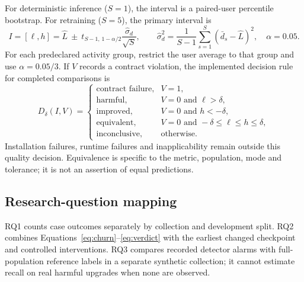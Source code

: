 For deterministic inference ($S=1$), the interval is a paired-user percentile
bootstrap. For retraining ($S=5$), the primary interval is
\begin{equation}
 I=[\ell,h]=\widehat L\ \pm\
 t_{S-1,\,1-\alpha/2}\frac{\widehat\sigma_d}{\sqrt S},\qquad
 \widehat\sigma_d^2=\frac{1}{S-1}\sum_{s=1}^{S}(\bar d_s-\widehat L)^2,
 \quad\alpha=0.05.
 \label{eq:interval}
\end{equation}
For each predeclared activity group, restrict the user average to that group
and use $\alpha=0.05/3$. If $V$ records a contract violation, the implemented
decision rule for completed comparisons is
\begin{equation}
 D_\delta(I,V)=
 \begin{cases}
  \text{contract failure}, & V=1,\\
  \text{harmful}, & V=0\text{ and }\ell>\delta,\\
  \text{improved}, & V=0\text{ and }h<-\delta,\\
  \text{equivalent}, & V=0\text{ and }-\delta\le\ell\le h\le\delta,\\
  \text{inconclusive}, & \text{otherwise}.
 \end{cases}
 \label{eq:verdict}
\end{equation}
Installation failures, runtime failures and inapplicability remain outside
this quality decision. Equivalence is specific to the metric, population,
mode and tolerance; it is not an assertion of equal predictions.

\subsection{Research-question mapping}
RQ1 counts case outcomes separately by collection and development split.
RQ2 combines Equations~\eqref{eq:churn}--\eqref{eq:verdict} with the earliest
changed checkpoint and controlled interventions. RQ3 compares recorded
detector alarms with full-population reference labels in a separate synthetic
collection; it cannot estimate recall on real harmful upgrades when none are
observed.
